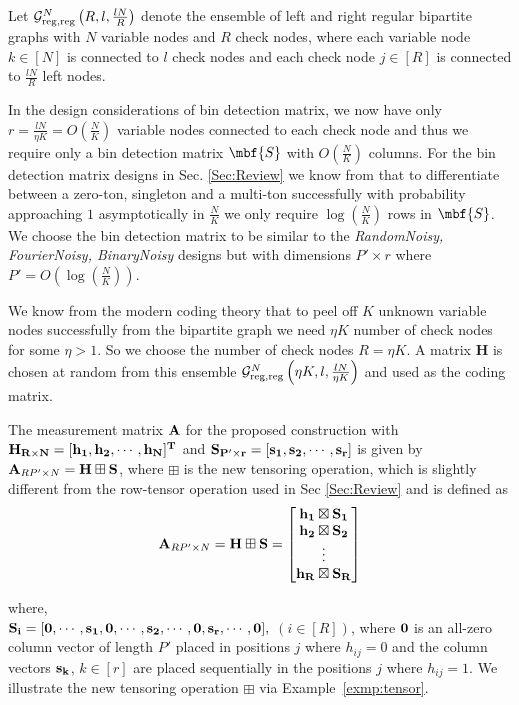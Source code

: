 \documentclass[conference]{IEEEtran}
\begin{document}
\begin{definition}\label{def:leftandrighreg}
Let $\mathcal{G}^N_{\rm reg,reg}\left(R,l, \frac{lN}{R} \right)$ denote the ensemble of left and right regular bipartite graphs with $N$ variable nodes and $R$ check nodes, where each variable node $k \in [N]$ is connected to $l$ check nodes and each check node $j \in [R]$ is connected to $\frac{lN}{R}$ left nodes.
\end{definition}
In the design considerations of bin detection matrix, we now have only $r=\frac{lN}{\eta K}=O\left(\frac{N}{K}\right)$ variable nodes connected to each check node and thus we require only a bin detection matrix $\mbf{S}$ with $O(\frac{N}{K})$ columns. For the bin detection matrix designs in Sec. \ref{Sec:Review} we know from \cite{li2015subdraft} that to differentiate between a zero-ton, singleton and a multi-ton successfully with probability approaching $1$ asymptotically in $\frac{N}{K}$ we only require $\log(\frac{N}{K})$ rows in $\mbf{S}$. We choose the bin detection matrix to be similar to the \emph{RandomNoisy, FourierNoisy, BinaryNoisy} designs but with dimensions $P'\times r$ where $P'=O\left(\log(\frac{N}{K})\right)$.

We know from the modern coding theory that to peel off $K$ unknown variable nodes successfully from the bipartite graph we need $\eta K$ number of check nodes for some $\eta>1$. So we choose the number of check nodes $R = \eta K$. A matrix $\mathbf{H}$ is chosen at random from this ensemble $\mathcal{G}^N_{\rm reg,reg}\left(\eta K,l, \frac{lN}{\eta K} \right)$ and used as the coding matrix.

The measurement matrix $\bf A$ for the proposed construction with $\bf H_{R \times N} = [h_1, h_2, \cdots, h_N]^{T}$ and $\bf S_{P' \times r}= [s_1, s_2, \cdots ,s_r]$ is given by $ {\bf A}_{RP' \times N} = {\bf H \boxplus S }$,
 where $ \boxplus$ is the new tensoring operation, which is slightly different from the row-tensor operation used in Sec \ref{Sec:Review} and is defined as
  \[ {\bf A}_{RP' \times N} = {\bf H \boxplus S } = \begin{bmatrix} \bf
 h_1 \boxtimes S_1 \\ \bf
 h_2 \boxtimes S_2 \\ \bf
 \vdots\\ \bf
 h_R \boxtimes S_R  \bf
\end{bmatrix}  \]

 where, \\
 $\bf S_i= [0, \cdots, s_1 , 0, \cdots, s_2, \cdots, 0, s_r, \cdots, 0],$ $(i\in[R])$, where $\bf 0$ is an all-zero column vector of length $P'$ placed in positions $j$ where $h_{ij}=0$ and the column vectors $\bf s_k$, $k\in[r]$ are placed sequentially in the positions $j$ where $h_{ij}=1$.
We illustrate the new tensoring operation $\boxplus$ via Example~\ref{exmp:tensor}.
\end{document}
